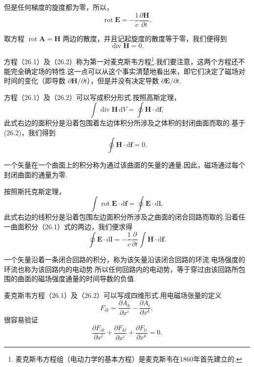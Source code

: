 但是任何梯度的旋度都为零，所以，
\begin{equation}
  \operatorname{rot}\boldsymbol{E}
  =-\frac{1}{c}\frac{\partial\boldsymbol{H}}{\partial t}.
\end{equation}

取方程 $\operatorname{rot}\boldsymbol{A}=\boldsymbol{H}$
两边的散度，并且记起旋度的散度等于零，我们便得到
\begin{equation}
  \operatorname{div}\boldsymbol{H}=0.
\end{equation}

方程（26.1）及（26.2）称为第一对麦克斯韦方程\footnote{麦克斯韦方程组（电动力学的基本方程）是麦克斯韦在1860年首先建立的.}.我们要注意，这两个方程还不能完全确定场的特性.这一点可以从这个事实清楚地看出来，即它们决定了磁场对时间的变化（即导数
$\partial\boldsymbol{H}/\partial t$），但是并没有决定导数 $\partial\boldsymbol{E}/\partial t$.

方程（26.1）及（26.2）可以写成积分形式.按照高斯定理，
\begin{equation*}
  \int\operatorname{div}\boldsymbol{H}\,\mathrm{d}V
  =\oint\boldsymbol{H}\cdot\mathrm{d}\boldsymbol{f},
\end{equation*}
此式右边的面积分是沿着包围着左边体积分所涉及之体积的封闭曲面而取的.基于 (26.2)，我们得到
\begin{equation}
  \oint\boldsymbol{H}\cdot\mathrm{d}\boldsymbol{f}=0.
\end{equation}

一个矢量在一个曲面上的积分称为通过该曲面的矢量的通量.因此，磁场通过每个封闭曲面的通量为零.

按照斯托克斯定理，
\begin{equation*}
  \int\operatorname{rot}\boldsymbol{E}\cdot\mathrm{d}\boldsymbol{f}
  =\oint\boldsymbol{E}\cdot\mathrm{d}\boldsymbol{l},
\end{equation*}
此式右边的线积分是沿着包围左边面积分所涉及之曲面的闭合回路而取的.沿着任一曲面积分（26.1）式的两边，我们便求得
\begin{equation}
  \oint\boldsymbol{E}\cdot\mathrm{d}\boldsymbol{l}
  =-\frac{1}{c}\frac{\partial}{\partial t}
  \int\boldsymbol{H}\cdot\mathrm{d}\boldsymbol{f}.
\end{equation}

一个矢量沿着一条闭合回路的积分，称为该矢量沿该闭合回路的环流.电场强度的环流也称为该回路内的电动势.所以任何回路内的电动势，等于穿过由该回路所包围的曲面的磁场强度通量的时间导数的负值.

麦克斯韦方程（26.1）及（26.2）可以写成四维形式.用电磁场张量的定义
\begin{equation*}
  F_{ik}=\frac{\partial A_k}{\partial x^i}-\frac{\partial A_i}{\partial x^k},
\end{equation*}
很容易验证
\begin{equation}
  \frac{\partial F_{ik}}{\partial x^l}
  +\frac{\partial F_{kl}}{\partial x^i}
  +\frac{\partial F_{li}}{\partial x^k}=0.
\end{equation}

